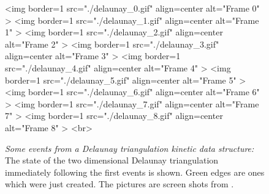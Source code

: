 \begin{figure}[htb]
\begin{ccHtmlOnly}

<img border=1 src="./delaunay_0.gif" align=center alt="Frame 0" >
<img border=1 src="./delaunay_1.gif" align=center alt="Frame 1" >
<img border=1 src="./delaunay_2.gif" align=center alt="Frame 2" >
<img border=1 src="./delaunay_3.gif" align=center alt="Frame 3" >
<img border=1 src="./delaunay_4.gif" align=center alt="Frame 4" >
<img border=1 src="./delaunay_5.gif" align=center alt="Frame 5" >
<img border=1 src="./delaunay_6.gif" align=center alt="Frame 6" >
<img border=1 src="./delaunay_7.gif" align=center alt="Frame 7" >
<img border=1 src="./delaunay_8.gif" align=center alt="Frame 8" >
<br>
\end{ccHtmlOnly}
\caption{ \label{fig:kds_delaunay_events} 
{\em Some events from a Delaunay triangulation kinetic data
structure:} The state of the two dimensional Delaunay triangulation
immediately following the first events is shown. Green edges are ones
which were just created. The pictures are screen shots from
. }
\end{figure}



